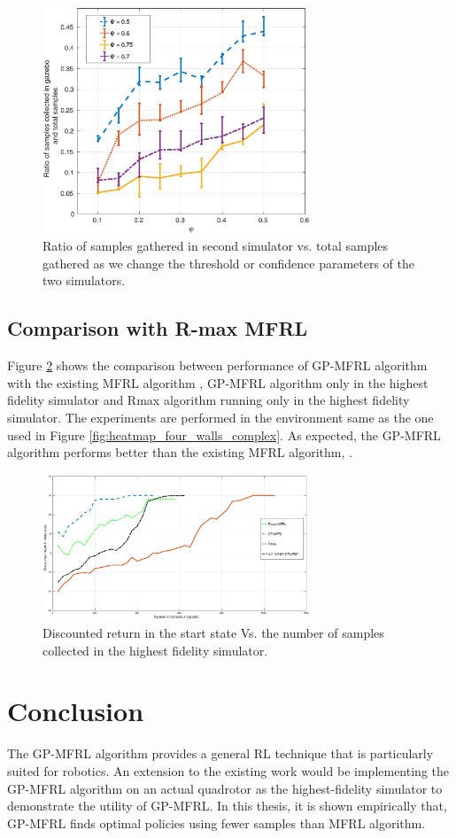 \documentclass[12pt]{report}
\begin{document}
\begin{figure}[htp]
	\centering
	\includegraphics[width=8cm]{thre.eps} 
	\caption{Ratio of samples gathered in second simulator vs. total samples gathered as we change the threshold or confidence parameters of the two simulators.}
   \label{fig:threshold}
\end{figure}

\subsection{Comparison with R-max MFRL}
Figure \ref{fig:value_function} shows the comparison between performance of GP-MFRL algorithm with the existing MFRL algorithm \cite{cutler2014reinforcement}, GP-MFRL algorithm only in the highest fidelity simulator and Rmax algorithm running only in the highest fidelity simulator. The experiments are performed in the environment same as the one used in Figure \ref{fig:heatmap_four_walls_complex}. As expected, the GP-MFRL algorithm performs better than the existing MFRL algorithm, \cite{cutler2014reinforcement}.
\begin{figure}[htp]
	\centering 
    \includegraphics[width=8cm]{reward.eps}
	\caption{ Discounted return in the start state Vs. the number of samples collected in the highest fidelity simulator.}
   \label{fig:value_function}
\end{figure}

\section{Conclusion}
The GP-MFRL algorithm provides a general RL technique that is particularly suited for robotics. An extension to the existing work would be implementing the GP-MFRL algorithm on an actual quadrotor as the highest-fidelity simulator to demonstrate the utility of GP-MFRL. In this thesis, it is shown empirically that, GP-MFRL finds optimal policies using fewer samples than MFRL algorithm. 
\end{document}
